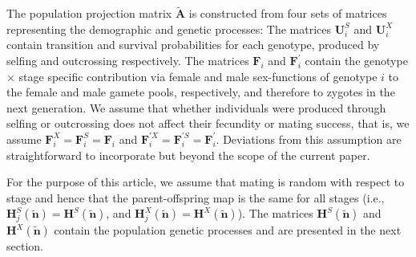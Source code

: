 \documentclass[11pt]{article}
\def\mbf#1{\mathbf{#1}}
\def\mcal#1{\mathcal{#1}}
\begin{document}
The population projection matrix $\tilde{\mbf{A}}$ is constructed from four sets of matrices representing the demographic and genetic processes: The matrices $\mbf{U}^{S}_{i}$ and $\mbf{U}^{X}_{i}$ contain transition and survival probabilities for each genotype, produced by selfing and outcrossing respectively. The matrices $\mbf{F}_{i}$ and $\mbf{F}^{\prime}_{i}$ contain the genotype $\times$ stage specific contribution via female and male sex-functions of genotype $i$ to the female and male gamete pools, respectively, and therefore to zygotes in the next generation. We assume that whether individuals were produced through selfing or outcrossing does not affect their fecundity or mating success, that is, we assume  $\mbf{F}^X_{i}=\mbf{F}^S_{i}=\mbf{F}_{i}$ and $\mbf{F}^{\prime X}_{i}=\mbf{F}^{\prime S}_{i}=\mbf{F}^{\prime}_{i}$. Deviations from this assumption are straightforward to incorporate but beyond the scope of the current paper. 


For the purpose of this article, we assume that mating is random with respect to stage and hence that the parent-offspring map is the same for all stages (i.e., $\mbf{H}^S_{j}(\tilde{\mbf{n}}) = \mbf{H}^S(\tilde{\mbf{n}})$, and $\mbf{H}^X_{j}(\tilde{\mbf{n}}) = \mbf{H}^X(\tilde{\mbf{n}})$). The matrices $\mbf{H}^S(\tilde{\mbf{n}})$ and $\mbf{H}^X(\tilde{\mbf{n}})$ contain the population genetic processes and are presented in the next section.
\end{document}

